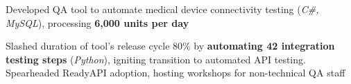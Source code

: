 \documentclass[letterpaper,11pt]{article}
\newcommand{\resumeItem}[1]{
  \item\small{
    {#1 \vspace{-1pt}}
  }
}
\begin{document}
        \resumeItem{Developed QA tool to automate medical device connectivity testing (\textit{C\#, MySQL}), processing \textbf{6,000 units per day}}
        
        \resumeItem{Slashed duration of tool's release cycle 80\% by \textbf{automating 42 integration testing steps} (\textit{Python}), igniting transition to automated API testing. Spearheaded ReadyAPI adoption, hosting workshops for non-technical QA staff}
        
\end{document}
